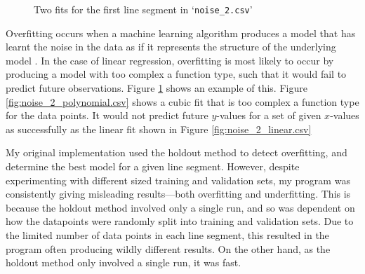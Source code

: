 \documentclass[onecolumn, 12pt, a4paper]{article}
\begin{document}
\begin{figure}[htbp]
    \centering
    \hfill
    \caption{Two fits for the first line segment in `\texttt{noise\_2.csv}'}
    \label{fig:noise_2.csv}
\end{figure}

Overfitting occurs when a machine learning algorithm
produces a model that has learnt the noise in the data
as if it represents the structure of the underlying
model \cite{MSMI}.
In the case of linear regression, overfitting is most
likely to occur by producing a model with too complex a function
type, such that it would fail to predict future observations.
Figure \ref{fig:noise_2.csv} shows an example of this. 
Figure \ref{fig:noise_2_polynomial.csv} shows a cubic fit that is too complex a 
function type for the data points.
It would not predict future $y$-values for a set of 
given $x$-values as successfully as the linear fit shown in Figure \ref{fig:noise_2_linear.csv}

My original implementation used the holdout method
to detect overfitting, and determine the best model for a given line segment.
However, despite experimenting with different
sized training and validation sets, my program was consistently
giving misleading results---both overfitting and underfitting.
This is because the holdout method involved only a single run,
and so was dependent on how the datapoints were randomly
split into training and validation sets.
Due to the limited number of data points in each line segment,
this resulted in the program often producing wildly different results.
On the other hand, as the holdout method only involved a single run, it was fast.
\end{document}
